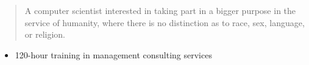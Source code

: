 \documentclass[10pt,a4paper,ragged2e,withhyper]{altacv}
\begin{document}
\begin{paracol}{2}
            
            \smallskip
        
        
        
        
        
        \newpage
        
        \switchcolumn
        
            \begin{quote}
                A computer scientist interested in taking part in a bigger purpose in the service of humanity, where there is no distinction as to race, sex, language, or religion.  
            \end{quote}
        
            \begin{itemize}
                \item 120-hour training in management consulting services 
            \end{itemize}
            \divider
            

\end{paracol}
\end{document}

